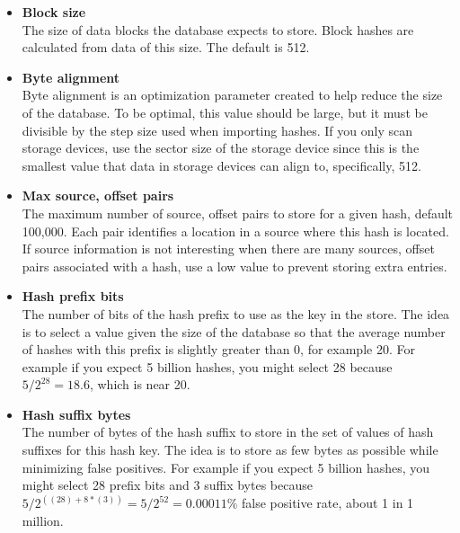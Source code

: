 \documentclass[11pt,fleqn]{article} %
\begin{document}
\begin{itemize}
\item \textbf{Block size}\\
The size of data blocks the database expects to store. Block hashes are calculated from data of this size. The default is 512.\\

\item \textbf{Byte alignment}\\
Byte alignment is an optimization parameter created to help reduce the size of the database. To be optimal, this value should be large, but it must be divisible by the step size used when importing hashes. If you only scan storage devices, use the sector size of the storage device since this is the smallest value that data in storage devices can align to, specifically, 512.\\

\item \textbf{Max source, offset pairs}\\
The maximum number of source, offset pairs to store for a given hash, default 100,000. Each pair identifies a location in a source where this hash is located. If source information is not interesting when there are many sources, offset pairs associated with a hash, use a low value to prevent storing extra entries.\\

\item \textbf{Hash prefix bits}\\
The number of bits of the hash prefix to use as the key in the store. The idea is to select a value given the size of the database so that the average number of hashes with this prefix is slightly greater than 0, for example 20. For example if you expect 5 billion hashes, you might select 28 because $5/2^{28}=18.6$, which is near 20.\\

\item \textbf{Hash suffix bytes}\\
The number of bytes of the hash suffix to store in the set of values of hash suffixes for this hash key. The idea is to store as few bytes as possible while minimizing false positives. For example if you expect 5 billion hashes, you might select 28 prefix bits and 3 suffix bytes because $5 / 2^{((28) + 8*(3))} = 5 / 2^{52} = 0.00011\%$ false positive rate, about 1 in 1 million.\\
\end{itemize}
\end{document}

